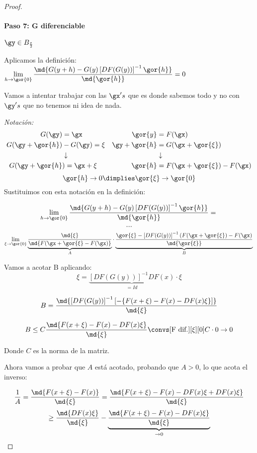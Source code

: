 \documentclass{apuntes}
\begin{document}
\begin{proof}
  \paragraph{Paso 7: G diferenciable}  $\gy \in B_{\frac{\varepsilon}{2}}$
  
  Aplicamos la definición: $\displaystyle\lim_{h \rightarrow \gor{0}}\frac{\md{G(y+h) - G(y) \left[DF(G(y))\right]^{-1} \gor{h}}}{\md{\gor{h}}} = 0$
  
  Vamos a intentar trabajar con las $\gx's$ que es donde sabemos todo y no con $\gy's$ que no tenemos ni idea de nada.
  
  \emph{Notación:\\}
  \begin{align*}
G(\gy) &= \gx & \gor{y} &= F(\gx)\\
G(\gy + \gor{h}) &- G(\gy) = \xi & \gy + \gor{h} &= G(\gx + \gor{\xi})\\
&\downarrow&\ &\downarrow\\
G(\gy + \gor{h}&) = \gx + \xi & \gor{h} &= F(\gx + \gor{\xi}) - F(\gx)
\end{align*}
$$\gor{h} \rightarrow 0 \dimplies \gor{\xi} \rightarrow \gor{0}$$
  Sustituimos con esta notación en la definición:
  
 
  $$\lim_{h \rightarrow \gor{0}}\frac{\md{G(y+h) - G(y) \left[DF(G(y))\right]^{-1} \gor{h}}}{\md{\gor{h}}} = \\$$
  $$...\\$$
  $$\lim_{\xi\rightarrow \gor{0}} \underbrace{\frac{\md{\xi}}{\md{F(\gx + \gor{\xi} - F(\gx)}}}_{A} %
  \cdot \underbrace{\frac{\gor{\xi} - \left[DF(G(y))\right]^{-1} (F(\gx +\gor{\xi}) - F(\gx)}{\md{\gor{\xi}}}}_{B}\\   $$
  
  Vamos a acotar B aplicando:
  $$\xi = \underbrace{\left[DF(G(y))\right]^{-1}DF(x)}_{=Id} \cdot \xi$$

  $$B = \frac{\md{\left[DF(G(y))\right]^{-1} \left[ -\{F(x+\xi)-F(x) - DF(x)\xi\}\right]}}{\md{\xi}}$$
  
  $$B\leq C \frac{\md{F(x+\xi) - F(x) - DF(x)\xi}}{\md{\xi}} \convs[\text{F dif.}][\xi][0] C\cdot 0 \rightarrow 0$$
  
  Donde $C$ es la norma de la matriz. 

  
  Ahora vamos a probar que $A$ está acotado, probando que $A>0$, lo que acota el inverso:
  
  $$\frac{1}{A} = \frac{\md{F(x+\xi)-F(x)}}{\md{\xi}} = \frac{\md{F(x+\xi) - F(x) - DF(x)\xi + DF(x)\xi}}{\md{\xi}}$$
  $$\geq \frac{\md{DF(x)\xi}}{\md{\xi}} - \underbrace{\frac{\md{F(x+\xi) - F(x) - DF(x)\xi}}{\md{\xi}}}_{\rightarrow 0}$$
  

\end{proof}
\end{document}
